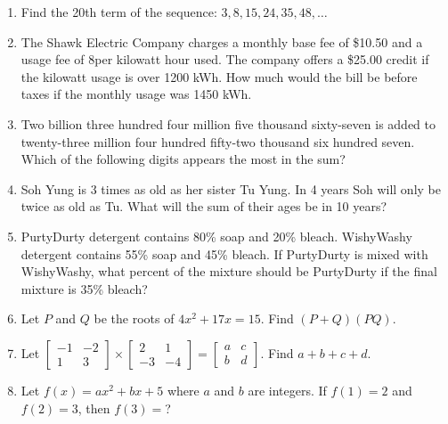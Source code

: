 \documentclass[../uilmath.tex]{subfiles}
\begin{document}
\begin{enumerate}[label=\bfseries\arabic*.]
        \item %
        Find the 20th term of the sequence: $3,8,15,24,35,48,\dots$

        \item %
        The Shawk Electric Company charges a monthly base fee of \$10.50 and a usage fee of 8\textcent per kilowatt hour used.
        The company offers a \$25.00 credit if the kilowatt usage is over 1200 kWh. How much would the bill be before taxes if the monthly usage was 1450 kWh.

        \item %
        Two billion three hundred four million five thousand sixty-seven is added to twenty-three million four hundred fifty-two thousand 
        six hundred seven. Which of the following digits appears the most in the sum?

        \item %
        Soh Yung is 3 times as old as her sister Tu Yung. In 4 years Soh will only be twice as old as Tu. What will the sum of their ages be in 10 years?

        \item %
        PurtyDurty detergent contains 80\% soap and 20\% bleach. WishyWashy detergent contains 55\% soap and 45\% bleach.
        If PurtyDurty is mixed with WishyWashy, what percent of the mixture should be PurtyDurty if the final mixture is 35\% bleach?

        \item %
        Let $P$ and $Q$ be the roots of $4x^2+17x=15$. Find $(P+Q)(PQ)$.

        \item %
        Let $\begin{bmatrix}
            -1 & -2 \\
            1 & 3
        \end{bmatrix}\times \begin{bmatrix}
            2 & 1 \\
            -3 & -4
        \end{bmatrix}=
        \begin{bmatrix}
            a & c \\
            b & d
        \end{bmatrix}$. Find $a+b+c+d$.

        \item %
        Let $f(x)=ax^2+bx+5$ where $a$ and $b$ are integers. If $f(1)=2$ and $f(2)=3$, then $f(3)=$?


\end{enumerate}
\end{document}
